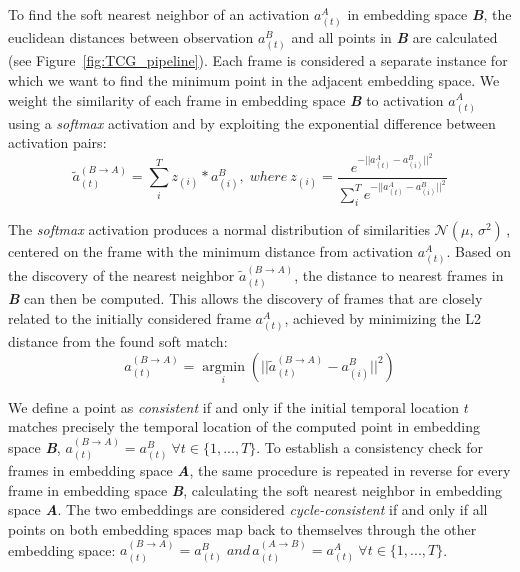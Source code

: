\documentclass[final,5p,times,twocolumn]{elsarticle}
\begin{document}
To find the soft nearest neighbor of an activation $a_{(t)}^{A}$ in embedding space \textbf{\textit{B}}, the euclidean distances between observation $a_{(t)}^{B}$ and all points in \textbf{\textit{B}} are calculated (see Figure~\ref{fig:TCG_pipeline}). Each frame is considered a separate instance for which we want to find the minimum point in the adjacent embedding space. We weight the similarity of each frame in embedding space \textbf{\textit{B}} to activation $a^{A}_{(t)}$ using a \textit{softmax} activation and by exploiting the exponential difference between activation pairs:
\vspace{-0.5mm}
\begin{equation}
    \label{eq:soft_nn}
    \widetilde{a}^{(B \rightarrow A)}_{(t)} = \sum_{i}^{T} z_{(i)}*a^{B}_{(i)}, \; where \: z_{(i)} = \frac{e^{-||a^{A}_{(t)} - a^{B}_{(i)}||^{2}}}{\sum \limits_{i}^{T} e^{-||a^{A}_{(t)} - a^{B}_{(i)}||^{2}}}
\end{equation}

The \textit{softmax} activation produces a normal distribution of similarities $\mathcal{N}(\mu,\,\sigma^{2})\,$, centered on the frame with the minimum distance from activation $a^{A}_{(t)}$. Based on the discovery of the nearest neighbor $\widetilde{a}^{(B \rightarrow A)}_{(t)}$, the distance to nearest frames in \textbf{\textit{B}} can then be computed. This allows the discovery of frames that are closely related to the initially considered frame $a^{A}_{(t)}$, achieved by minimizing the L2 distance from the found soft match: 
\vspace{-0.5mm}
\begin{equation}
    \label{eq:soft_nn_to_emb2}
    a^{(B \rightarrow A)}_{(t)} = \operatorname*{argmin}_{i}(||\widetilde{a}^{(B \rightarrow A)}_{(t)} - a^{B}_{(i)}||^{2}) 
\end{equation}

We define a point as \textit{consistent} if and only if the initial temporal location $t$ matches precisely the temporal location of the computed point in embedding space \textbf{\textit{B}}, $a^{(B \rightarrow A)}_{(t)} = a^{B}_{(t)} \: \forall t \in \{1,...,T\}$. To establish a consistency check for frames in embedding space \textbf{\textit{A}}, the same procedure is repeated in reverse for every frame in embedding space \textbf{\textit{B}}, calculating the soft nearest neighbor in embedding space \textbf{\textit{A}}. The two embeddings are considered \textit{cycle-consistent} if and only if all points on both embedding spaces map back to themselves through the other embedding space: $a^{(B \rightarrow A)}_{(t)} = a^{B}_{(t)} \; and \, a^{(A \rightarrow B)}_{(t)} = a^{A}_{(t)} \: \forall t \in \{1,...,T\}$.
\end{document}
